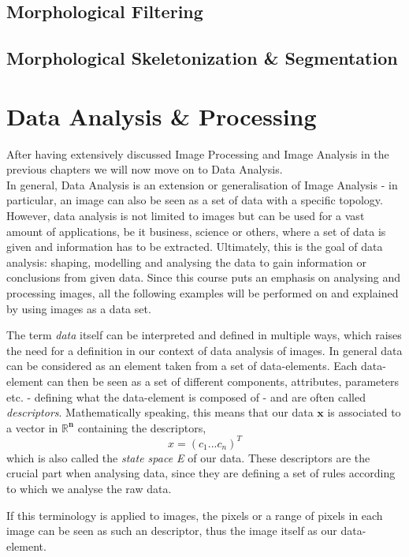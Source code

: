 \subsection{Morphological Filtering}

\subsection{Morphological Skeletonization \& Segmentation}


\section{Data Analysis \& Processing}
After having extensively discussed Image Processing and Image Analysis in the previous chapters we will now move on to Data Analysis. \\In general, Data Analysis is an extension or generalisation of Image Analysis - in particular, an image can also be seen as a set of data with a specific topology. However, data analysis is not limited to images but can be used for a vast amount of applications, be it business, science or others, where a set of data is given and information has to be extracted. Ultimately, this is the goal of data analysis: shaping, modelling and analysing the data to gain information or conclusions from given data.
Since this course puts an emphasis on analysing and processing images, all the following examples will be performed on and explained by using images as a data set.

The term \textit{data} itself can be interpreted and defined in multiple ways, which raises the need for a definition in our context of data analysis of images.
In general data can be considered as an element taken from a set of data-elements. Each data-element can then be seen as a set of different components, attributes, parameters etc. - defining what the data-element is composed of - and are often called \textit{descriptors}. Mathematically speaking, this means that our data $\boldsymbol{x}$ is associated to a vector in $\boldsymbol{\mathbb{R}^n}$ containing the descriptors,
\begin{equation*}
	x = (c_1 ... c_n)^T
\end{equation*}
which is also called the \textit{state space E} of our data.
These descriptors are the crucial part when analysing data, since they are defining a set of rules according to which we analyse the raw data.

If this terminology is applied to images, the pixels or a range of pixels in each image can be seen as such an descriptor, thus the image itself as our data-element.


